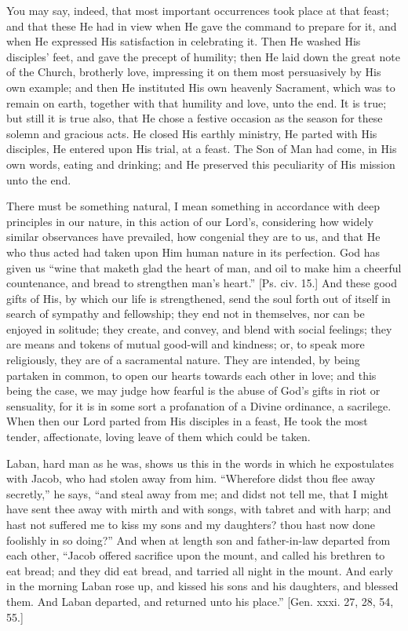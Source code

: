 You may say, indeed, that most important occurrences took place at
that feast; and that these He had in view when He gave the command to
prepare for it, and when He expressed His satisfaction in celebrating
it. Then He washed His disciples' feet, and gave the precept of
humility; then He laid down the great note of the Church, brotherly
love, impressing it on them most persuasively by His own example; and
then He instituted His own heavenly Sacrament, which was to remain on
earth, together with that humility and love, unto the end. It is true;
but still it is true also, that He chose a festive occasion as the
season for these solemn and gracious acts. He closed His earthly
ministry, He parted with His disciples, He entered upon His trial, at
a feast. The Son of Man had come, in His own words, eating and
drinking; and He preserved this peculiarity of His mission unto the
end.

There must be something natural, I mean something in accordance
with deep principles in our nature, in this action of our Lord's,
considering how widely similar observances have prevailed, how
congenial they are to us, and that He who thus acted had taken upon
Him human nature in its perfection. God has given us ``wine that
maketh glad the heart of man, and oil to make him a cheerful
countenance, and bread to strengthen man's heart.'' [Ps. civ. 15.]
And these good gifts of His, by which our life is strengthened, send
the soul forth out of itself in search of sympathy and fellowship;
they end not in themselves, nor can be enjoyed in solitude; they
create, and convey, and blend with social feelings; they are means and
tokens of mutual good-will and kindness; or, to speak more
religiously, they are of a sacramental nature. They are intended, by
being partaken in common, to open our hearts towards each other in
love; and this being the case, we may judge how fearful is the abuse
of God's gifts in riot or sensuality, for it is in some sort a
profanation of a Divine ordinance, a sacrilege. When then our Lord
parted from His disciples in a feast, He took the most tender,
affectionate, loving leave of them which could be taken.

Laban, hard man as he was, shows us this in the words in which he
expostulates with Jacob, who had stolen away from him. ``Wherefore
didst thou flee away secretly,'' he says, ``and steal away
from me; and didst not tell me, that I might have sent thee away with
mirth and with songs, with tabret and with harp; and hast not suffered
me to kiss my sons and my daughters? thou hast now done foolishly in
so doing?'' And when at length son and father-in-law departed from
each other, ``Jacob offered sacrifice upon the mount, and called
his brethren to eat bread; and they did eat bread, and tarried all
night in the mount. And early in the morning Laban rose up, and kissed
his sons and his daughters, and blessed them. And Laban departed, and
returned unto his place.'' [Gen. xxxi. 27, 28, 54, 55.]

